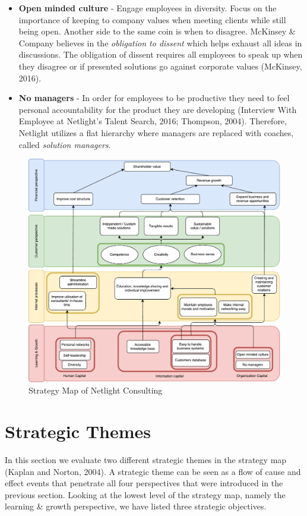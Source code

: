 \documentclass[12pt]{article}
\begin{document}
\begin{itemize}
\item \textbf{Open minded culture} - Engage employees in diversity. Focus on the importance of keeping to company values when meeting clients while still being open. Another side to the same coin is when to disagree. McKinsey \& Company believes in the \textit{obligation to dissent} which helps exhaust all ideas in discussions. The obligation of dissent requires all employees to speak up when they disagree or if presented solutions go against corporate values (McKinsey, 2016). 
\item \textbf{No managers} - In order for employees to be productive they need to feel personal accountability for the product they are developing (Interview With Employee at Netlight's Talent Search, 2016; Thompson, 2004). Therefore, Netlight utilizes a flat hierarchy where managers are replaced with coaches, called \textit{solution managers}.
\end{itemize}
\enlargethispage{2\baselineskip}
\begin{figure}[h!tp]
\hspace*{-20pt}\includegraphics[scale=0.7]{StrategyMap}
\caption{Strategy Map of Netlight Consulting}
\end{figure}

\newpage
\section*{Strategic Themes}
In this section we evaluate two different strategic themes in the strategy map (Kaplan and Norton, 2004). A strategic theme can be seen as a flow of cause and effect events that penetrate all four perspectives that were introduced in the previous section. Looking at the lowest level of the strategy map, namely the learning \& growth perspective, we have listed three strategic objectives.
\end{document}
